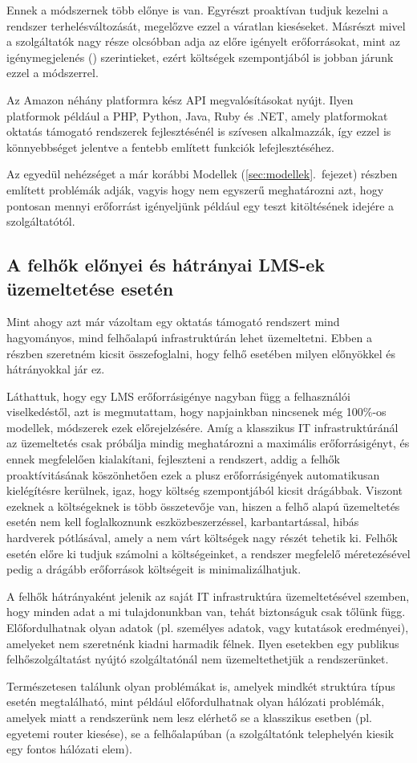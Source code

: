 Ennek a módszernek több előnye is van. Egyrészt proaktívan tudjuk kezelni a rendszer terhelésváltozását, megelőzve ezzel a váratlan kieséseket. Másrészt mivel a szolgáltatók nagy része olcsóbban adja az előre igényelt erőforrásokat, mint az igénymegjelenés () szerintieket, ezért költségek szempontjából is jobban járunk ezzel a módszerrel.

Az Amazon néhány platformra kész API megvalósításokat nyújt. Ilyen platformok például a PHP, Python, Java, Ruby és .NET, amely platformokat oktatás támogató rendszerek fejlesztésénél is szívesen alkalmazzák, így ezzel is könnyebbséget jelentve a fentebb említett funkciók lefejlesztéséhez.

Az egyedül nehézséget a már korábbi Modellek (\ref{sec:modellek}.~fejezet) részben említett problémák adják, vagyis hogy nem egyszerű meghatározni azt, hogy pontosan mennyi erőforrást igényeljünk például egy teszt kitöltésének idejére a szolgáltatótól. 

\subsection{A felhők előnyei és hátrányai LMS-ek üzemeltetése esetén}

Mint ahogy azt már vázoltam egy oktatás támogató rendszert mind hagyományos, mind felhőalapú infrastruktúrán lehet üzemeltetni. Ebben a részben szeretném kicsit összefoglalni, hogy felhő esetében milyen előnyökkel és hátrányokkal jár ez.

Láthattuk, hogy egy LMS erőforrásigénye nagyban függ a felhasználói viselkedéstől, azt is megmutattam, hogy napjainkban nincsenek még 100\%-os modellek, módszerek ezek előrejelzésére. Amíg a klasszikus IT infrastruktúránál az üzemeltetés csak próbálja mindig meghatározni a maximális erőforrásigényt, és ennek megfelelően kialakítani, fejleszteni a rendszert, addig a felhők proaktívitásának köszönhetően ezek a plusz erőforrásigények automatikusan kielégítésre kerülnek, igaz, hogy költség szempontjából kicsit drágábbak. Viszont ezeknek a költségeknek is több összetevője van, hiszen a felhő alapú üzemeltetés esetén nem kell foglalkoznunk eszközbeszerzéssel, karbantartással, hibás hardverek pótlásával, amely a nem várt költségek nagy részét tehetik ki. Felhők esetén előre ki tudjuk számolni a költségeinket, a rendszer megfelelő méretezésével pedig a drágább  erőforrások költségeit is minimalizálhatjuk.

A felhők hátrányaként jelenik az saját IT infrastruktúra üzemeltetésével szemben, hogy minden adat a mi tulajdonunkban van, tehát biztonságuk csak tőlünk függ. Előfordulhatnak olyan adatok (pl. személyes adatok, vagy kutatások eredményei), amelyeket nem szeretnénk kiadni harmadik félnek. Ilyen esetekben egy publikus felhőszolgáltatást nyújtó szolgáltatónál nem üzemeltethetjük a rendszerünket.

Természetesen találunk olyan problémákat is, amelyek mindkét struktúra típus esetén megtalálható, mint például előfordulhatnak olyan hálózati problémák, amelyek miatt a rendszerünk nem lesz elérhető se a klasszikus esetben (pl. egyetemi router kiesése), se a felhőalapúban (a szolgáltatónk telephelyén kiesik egy fontos hálózati elem).
